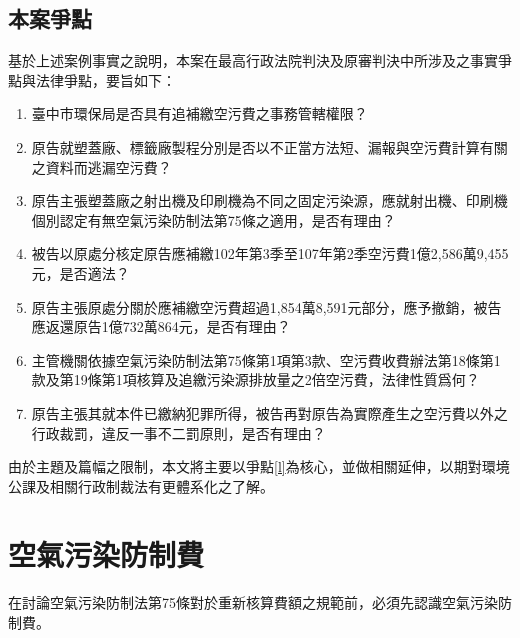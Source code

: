 \documentclass[14pt,a4paper]{article}
\begin{document}
\subsection{本案爭點}
基於上述案例事實之說明，本案在最高行政法院判決及原審判決中所涉及之事實爭點與法律爭點，要旨如下：
\begin{enumerate}[itemsep=0em]
  \item 臺中市環保局是否具有追補繳空污費之事務管轄權限？
  \item 原告就塑蓋廠、標籤廠製程分別是否以不正當方法短、漏報與空污費計算有關之資料而逃漏空污費？
  \item 原告主張塑蓋廠之射出機及印刷機為不同之固定污染源，應就射出機、印刷機個別認定有無空氣污染防制法第75條之適用，是否有理由？
  \item 被告以原處分核定原告應補繳102年第3季至107年第2季空污費1億2,586萬9,455元，是否適法？
  \item 原告主張原處分關於應補繳空污費超過1,854萬8,591元部分，應予撤銷，被告應返還原告1億732萬864元，是否有理由？
  \item 主管機關依據空氣污染防制法第75條第1項第3款、空污費收費辦法第18條第1款及第19條第1項核算及追繳污染源排放量之2倍空污費，法律性質爲何？\label{l}
  \item 原告主張其就本件已繳納犯罪所得，被告再對原告為實際產生之空污費以外之行政裁罰，違反一事不二罰原則，是否有理由？
\end{enumerate}

由於主題及篇幅之限制，本文將主要以爭點\ref{l}為核心，並做相關延伸，以期對環境公課及相關行政制裁法有更體系化之了解。

\section{空氣污染防制費}
在討論空氣污染防制法第75條對於重新核算費額之規範前，必須先認識空氣污染防制費。

\end{document}
